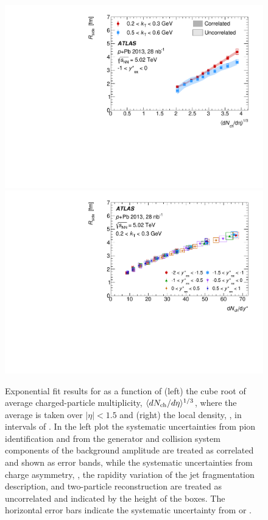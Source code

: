 \begin{figure}[t]
\centering
\includegraphics[width=0.49\linewidth]{canqosl_Rside_vs_avg_mult.pdf}
\includegraphics[width=0.49\linewidth]{canqosl_Rside_kt1_vs_mult.pdf}
\caption{Exponential fit results for \Rside as a function of (left) the cube root of average charged-particle multiplicity, $\langle d\mbox{$N_{\mathrm{ch}}$}/d\eta\rangle^{1/3}$, where the average is taken over $|\eta| < 1.5$ and (right) the local density, \dNdy, in intervals of \kys. In the left plot the systematic uncertainties from pion identification and from the generator and collision system components of the background amplitude are treated as correlated and shown as error bands, while the systematic uncertainties from charge asymmetry, \Reff, the rapidity variation of the jet fragmentation description, and two-particle reconstruction are treated as uncorrelated and indicated by the height of the boxes. The horizontal error bars indicate the systematic uncertainty from \avgdNdeta or \dNdy.}
\label{fig:results_Rside_mult}
\end{figure}


